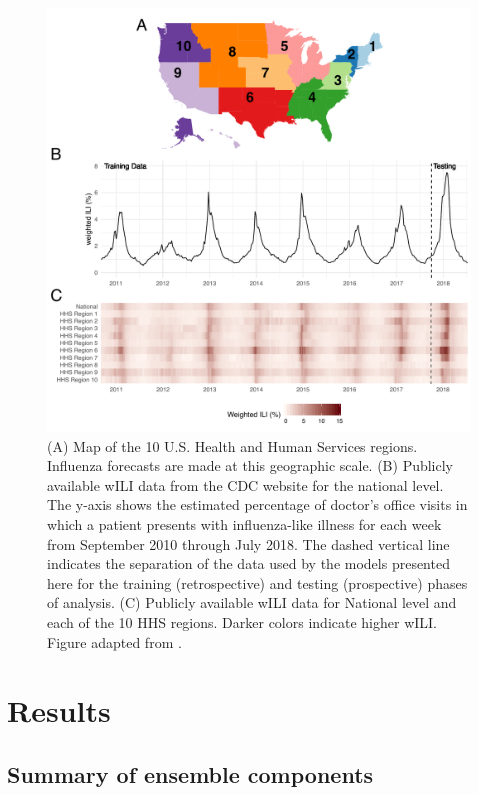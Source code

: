 \documentclass{article}\usepackage[]{graphicx}\usepackage[]{color}
\begin{document}
\begin{figure}[htbp]
\begin{center}
\includegraphics[width=\textwidth]{static-content/overview-figure-edited.pdf}
\caption{(A) Map of the 10 U.S. Health and Human Services regions. Influenza forecasts are made at this geographic scale. (B) Publicly available wILI data from the CDC website for the national level. The y-axis shows the estimated percentage of doctor's office visits in which a patient presents with influenza-like illness for each week from September 2010 through July 2018. The dashed vertical line indicates the separation of the data used by the models presented here for the training (retrospective) and testing (prospective) phases of analysis. (C) Publicly available wILI data for National level and each of the 10 HHS regions. Darker colors indicate higher wILI. Figure adapted from \cite{reich2019collaborative}.}
\label{fig:overview-schematic}
\end{center}
\end{figure}


\section*{Results}

\subsection*{Summary of ensemble components} \label{subsec:comp-models}
\end{document}
